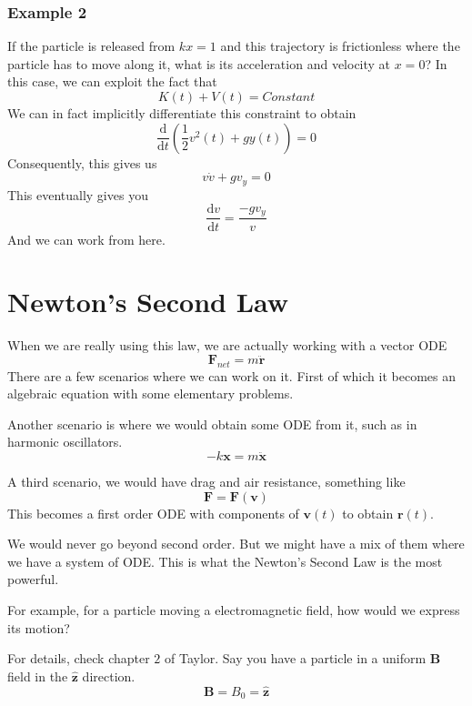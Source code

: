 \documentclass[12pt]{article}
\newcommand{\dydx}[2]{\frac{\text{d} #1}{\text{d} #2}}
\newcommand{\paren}[1]{\left( #1 \right)}
\newcommand{\unz}{\hat{\mathbf{z}}}
\begin{document}
    \subsubsection{Example 2}
    If the particle is released from $kx=1$ and this trajectory is frictionless where the particle has to move along it, what is its acceleration and velocity at $x=0$? In this case, we can exploit the fact that
    \[
    K(t) + V(t) = \textit{Constant}
    \]
    We can in fact implicitly differentiate this constraint to obtain
    \[
    \dydx{}{t}\paren{ \frac{1}{2}v^2(t) + gy(t)} = 0
    \]
    Consequently, this gives us
    \[
    v\dot{v} + gv_y = 0
    \]
    This eventually gives you
    \[
    \dydx{v}{t} = \frac{-g v_y}{v}
    \]
    And we can work from here.




\section{Newton's Second Law}
    When we are really using this law, we are actually working with a vector ODE
    \[
    \mathbf{F}_{net} = m\ddot{\mathbf{r}}
    \]
    There are a few scenarios where we can work on it. First of which it becomes an algebraic equation with some elementary problems.

    Another scenario is where we would obtain some ODE from it, such as in harmonic oscillators. 
        \[
        -k\mathbf{x} = m\ddot{\mathbf{x}}
        \]

    A third scenario, we would have drag and air resistance, something like
    \[
    \mathbf{F} = \mathbf{F}(\mathbf{v})
    \]
    This becomes a first order ODE with components of $\mathbf{v}(t)$ to obtain $\mathbf{r}(t)$.

    We would never go beyond second order. But we might have a mix of them where we have a system of ODE. This is what the Newton's Second Law is the most powerful. 

    For example, for a particle moving a electromagnetic field, how would we express its motion?

    For details, check chapter $2$ of Taylor. Say you have a particle in a uniform \textbf{B} field in the $\unz$ direction. 
    \[
    \mathbf{B} = B_0 = \unz
    \]
\end{document}
